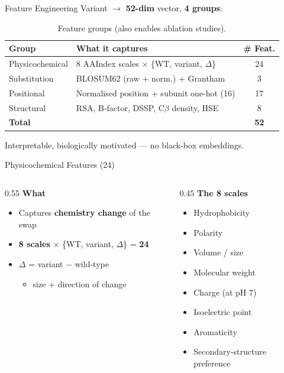 \documentclass[aspectratio=169]{beamer}
\begin{document}
\begin{frame}{Feature Engineering}
Variant $\rightarrow$ \textbf{52-dim} vector, \textbf{4 groups}:
\vspace{0.2cm}
\begin{table}
\centering
\small
\begin{tabular}{@{}llc@{}}
\toprule
\textbf{Group} & \textbf{What it captures} & \textbf{\# Feat.} \\
\midrule
Physicochemical & 8 AAIndex scales $\times$ \{WT, variant, $\Delta$\} & 24 \\
Substitution    & BLOSUM62 (raw + norm.) + Grantham & 3 \\
Positional      & Normalised position + subunit one-hot (16) & 17 \\
Structural      & RSA, B-factor, DSSP, C$\beta$ density, HSE & 8 \\
\midrule
\textbf{Total}  & & \textbf{52} \\
\bottomrule
\end{tabular}
\caption{Feature groups (also enables ablation studies).}
\end{table}
\footnotesize Interpretable, biologically motivated --- no black-box embeddings.
\end{frame}

\begin{frame}{Physicochemical Features (24)}
\begin{columns}[T]
\begin{column}{0.55\textwidth}
\textbf{What}
\begin{itemize}\setlength\itemsep{0.5em}
  \item Captures \textbf{chemistry change} of the swap
  \item \textbf{8 scales} $\times$ \{WT, variant, $\Delta$\} = \textbf{24}
  \item $\Delta$ = variant $-$ wild-type
        \begin{itemize}
          \item size + direction of change
        \end{itemize}
\end{itemize}
\end{column}
\begin{column}{0.45\textwidth}
\small
\textbf{The 8 scales}
\begin{itemize}\setlength\itemsep{0.15em}
  \item Hydrophobicity
  \item Polarity
  \item Volume / size
  \item Molecular weight
  \item Charge (at pH 7)
  \item Isoelectric point
  \item Aromaticity
  \item Secondary-structure preference
\end{itemize}
\end{column}
\end{columns}
\end{frame}
\end{document}
